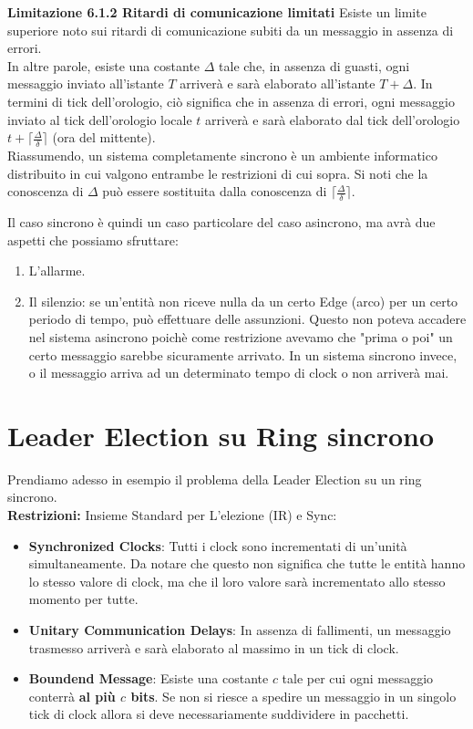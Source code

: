 \textbf{Limitazione 6.1.2 Ritardi di comunicazione limitati} Esiste un limite superiore noto sui ritardi di comunicazione subiti da un messaggio in assenza di errori.\\
In altre parole, esiste una costante $\Delta$ tale che, in assenza di guasti, ogni messaggio inviato all'istante $T$ arriverà e sarà elaborato all'istante $T + \Delta$. In termini di tick dell'orologio, ciò significa che in assenza di errori, ogni messaggio inviato al tick dell'orologio locale $t$ arriverà e sarà elaborato dal tick dell'orologio $t + \lceil \frac{\Delta}{\delta} \rceil$ (ora del mittente).\\
Riassumendo, un sistema completamente sincrono è un ambiente informatico distribuito in cui valgono entrambe le restrizioni di cui sopra. Si noti che la conoscenza di $\Delta$ può essere sostituita dalla conoscenza di $\lceil \frac{\Delta}{\delta} \rceil$.

Il caso sincrono è quindi un caso particolare del caso asincrono, ma avrà due aspetti che possiamo sfruttare:
\begin{enumerate}
   \item L'allarme.
   \item Il silenzio: se un'entità non riceve nulla da un certo Edge (arco) per un certo periodo di tempo, può effettuare delle assunzioni. Questo non poteva accadere nel sistema asincrono poichè come restrizione avevamo che "prima o poi" un certo messaggio sarebbe sicuramente arrivato.  In un sistema sincrono invece, o il messaggio arriva ad un determinato tempo di clock o non arriverà mai.
\end{enumerate}

\section{Leader Election su Ring sincrono}
Prendiamo adesso in esempio il problema della Leader Election su un ring sincrono.\\
\textbf{Restrizioni:} Insieme Standard per L'elezione (IR) e Sync:
\begin{itemize}
    \item \textbf{Synchronized Clocks}: Tutti i clock sono incrementati di un'unità simultaneamente. Da notare che questo non significa che tutte le entità hanno lo stesso valore di clock, ma che il loro valore sarà incrementato allo stesso momento per tutte.
    \item \textbf{Unitary Communication Delays}: In assenza di fallimenti, un messaggio trasmesso arriverà e sarà elaborato al massimo in un tick di clock.
    \item \textbf{Boundend Message}: Esiste una costante $c$ tale per cui ogni messaggio conterrà \textbf{al più $c$ bits}. Se non si riesce a spedire un messaggio in un singolo tick di clock allora si deve necessariamente suddividere in pacchetti.
\end{itemize}


